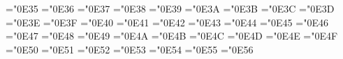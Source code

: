 \mathchardef\searrow ="0E35
\let\mLowerRightArrow=\searrow 
\mathchardef\swarrow ="0E36
\let\mLowerLeftArrow=\swarrow 
\mathchardef\longrightarrow ="0E37
\let\mLongRightArrow=\longrightarrow 
\mathchardef\longleftarrow ="0E38
\let\mLongLeftArrow=\longleftarrow 
\mathchardef\Longleftarrow ="0E39
\let\mDoubleLongLeftArrow=\Longleftarrow 
\mathchardef\Longrightarrow ="0E3A
\let\mDoubleLongRightArrow=\Longrightarrow 
\mathchardef\longleftrightarrow ="0E3B
\let\mLongLeftRightArrow=\longleftrightarrow 
\mathchardef\Longleftrightarrow ="0E3C
\let\mDoubleLongLeftRightArrow=\Longleftrightarrow 
\mathchardef\RightArrowLeftArrow ="0E3D
\let\mRightArrowLeftArrow=\RightArrowLeftArrow 
\mathchardef\LeftArrowRightArrow ="0E3E
\let\mLeftArrowRightArrow=\LeftArrowRightArrow 
\mathchardef\UpArrowDownArrow ="0E3F
\let\mUpArrowDownArrow=\UpArrowDownArrow 
\mathchardef\DownArrowUpArrow ="0E40
\let\mDownArrowUpArrow=\DownArrowUpArrow 
\mathchardef\rightharpoonup ="0E41
\let\mRightVector=\rightharpoonup 
\mathchardef\DownRightVector ="0E42
\let\mDownRightVector=\DownRightVector 
\mathchardef\leftharpoonup ="0E43
\let\mLeftVector=\leftharpoonup 
\mathchardef\DownLeftVector ="0E44
\let\mDownLeftVector=\DownLeftVector 
\mathchardef\RightUpVector ="0E45
\let\mRightUpVector=\RightUpVector 
\mathchardef\LeftUpVector ="0E46
\let\mLeftUpVector=\LeftUpVector 
\mathchardef\RightDownVector ="0E47
\let\mRightDownVector=\RightDownVector 
\mathchardef\LeftDownVector ="0E48
\let\mLeftDownVector=\LeftDownVector 
\mathchardef\LeftRightVector ="0E49
\let\mLeftRightVector=\LeftRightVector 
\mathchardef\DownLeftRightVector ="0E4A
\let\mDownLeftRightVector=\DownLeftRightVector 
\mathchardef\RightUpDownVector ="0E4B
\let\mRightUpDownVector=\RightUpDownVector 
\mathchardef\LeftUpDownVector ="0E4C
\let\mLeftUpDownVector=\LeftUpDownVector 
\mathchardef\RightVectorBar ="0E4D
\let\mRightVectorBar=\RightVectorBar 
\mathchardef\DownRightVectorBar ="0E4E
\let\mDownRightVectorBar=\DownRightVectorBar 
\mathchardef\LeftVectorBar ="0E4F
\let\mLeftVectorBar=\LeftVectorBar 
\mathchardef\DownLeftVectorBar ="0E50
\let\mDownLeftVectorBar=\DownLeftVectorBar 
\mathchardef\RightUpVectorBar ="0E51
\let\mRightUpVectorBar=\RightUpVectorBar 
\mathchardef\LeftUpVectorBar ="0E52
\let\mLeftUpVectorBar=\LeftUpVectorBar 
\mathchardef\RightDownVectorBar ="0E53
\let\mRightDownVectorBar=\RightDownVectorBar 
\mathchardef\LeftDownVectorBar ="0E54
\let\mLeftDownVectorBar=\LeftDownVectorBar 
\mathchardef\RightTeeVector ="0E55
\let\mRightTeeVector=\RightTeeVector 
\mathchardef\DownRightTeeVector ="0E56
\let\mDownRightTeeVector=\DownRightTeeVector 
